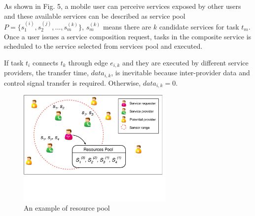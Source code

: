 \documentclass[journal]{IEEEtran}
\begin{document}
As shown in Fig. 5, a mobile user can perceive services exposed by other users and these available services can be described as service pool $P = \{s_1^{(i)}, s_2^{(j)}, ..., s_m^{(k)} \}$, $s_m^{(k)}$ means there are $k$ candidate services for task $t_m$. Once a user issues a service composition request, tasks in the composite service is scheduled to the service selected from services pool and executed. 

If task $t_i$ connects $t_k$ through edge $e_{i,k}$ and they are executed by different service providers, the transfer time, $data_{i,k}$, is inevitable because inter-provider data and control signal transfer is required. Otherwise, $data_{i,k} = 0 $.


\begin{figure}[!t]
\centering
\includegraphics[width=3in]{./img/pic-extra.pdf}
\caption{An example of resource pool}
\label{Resource Pool}
\end{figure}

\end{document}
